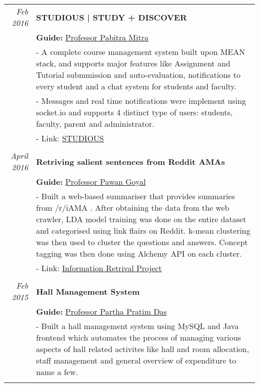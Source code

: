 \documentclass[a4paper,10pt]{article} %
\begin{document}
\begin{tabular}{r|p{15cm}}
\emph{Feb 2016} & \textbf{STUDIOUS | STUDY + DISCOVER }\\
& \textbf{Guide: }\textmd{\href{http://cse.iitkgp.ac.in/~pabitra/}{Professor Pabitra Mitra}}\\
& \footnotesize{- A complete course management system built upon MEAN stack, and supports major features like Assignment and Tutorial submmission and auto-evaluation, notifications to every student and a chat system for students and faculty.}\\
& \footnotesize{- Messages and real time notifications were implement using socket.io and supports 4 distinct type of users: students, faculty, parent and administrator.
}\\
& \footnotesize{- Link: \href{https://github.com/ghostwriternr/dbmsass3}{STUDIOUS}}\\
\multicolumn{2}{c}{} \\

\emph{April 2016} & \textbf{Retriving salient sentences from Reddit AMAs}\\
& \textbf{Guide: }\textmd{\href{http://cse.iitkgp.ac.in/~pawang/}{Professor Pawan Goyal}}\\
& \footnotesize{- Built a web-based summariser that provides summaries from /r/iAMA . After obtaining the data from the web crawler, LDA model training was done on the entire dataset and categorised using link flairs on Reddit. k-mean clustering was then used to cluster the questions and answers. Concept tagging was then done using Alchemy API on each cluster.}\\
& \footnotesize{- Link: \href{https://github.com/sayan1994/IR}{Information Retrival Project}}\\
\multicolumn{2}{c}{} \\

\emph{Feb 2015} & \textbf{Hall Management System}\\
& \textbf{Guide: }\textmd{\href{http://www.iitkgp.ac.in/fac-profiles/showprofile.php?empcode=SSmUZ}{Professor Partha Pratim Das}}\\
& \footnotesize{- Built a hall management system using MySQL and Java frontend which automates the process of managing various aspects of hall related activites like hall and room allocation, staff management and general overview of expenditure to name a few.}\\
\multicolumn{2}{c}{} \\
\end{tabular}

\end{document}
